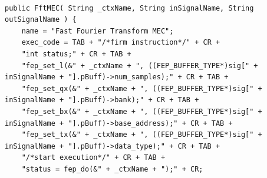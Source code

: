 \documentclass{llncs}
\begin{document}
\begin{lstlisting}[frame=lt, basicstyle=\fontsize{8}{9}\ttfamily,
                   label=lst:FftMEC,
                   float=htpb,
                   caption=Example of Model Extension Construct for a Fast Fourier Transform for the Front End Processor (FEP) of EMBB]

public FftMEC( String _ctxName, String inSignalName, String outSignalName )	{
	name = "Fast Fourier Transform MEC";
	exec_code = TAB + "/*firm instruction*/" + CR +
	"int status;" + CR + TAB +
	"fep_set_l(&" + _ctxName + ", ((FEP_BUFFER_TYPE*)sig[" + inSignalName + "].pBuff)->num_samples);" + CR + TAB +
	"fep_set_qx(&" + _ctxName + ", ((FEP_BUFFER_TYPE*)sig[" + inSignalName + "].pBuff)->bank);" + CR + TAB +
	"fep_set_bx(&" + _ctxName + ", ((FEP_BUFFER_TYPE*)sig[" + inSignalName + "].pBuff)->base_address);" + CR + TAB +
	"fep_set_tx(&" + _ctxName + ", ((FEP_BUFFER_TYPE*)sig[" + inSignalName + "].pBuff)->data_type);" + CR + TAB +
	"/*start execution*/" + CR + TAB +
	"status = fep_do(&" + _ctxName + ");" + CR;
	

\end{lstlisting}
\end{document}
